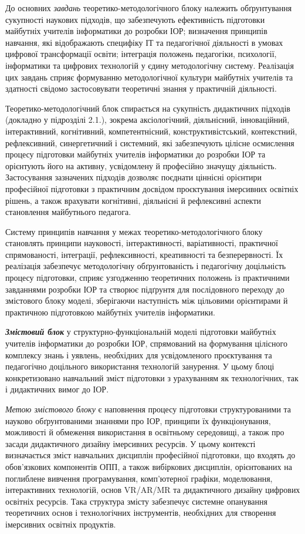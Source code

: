 До основних \emph{завдань} теоретико-методологічного блоку належить обґрунтування сукупності наукових підходів, що забезпечують ефективність підготовки майбутніх учителів інформатики до розробки ІОР; визначення принципів навчання, які відображають специфіку ІТ та педагогічної діяльності в умовах цифрової трансформації освіти; інтеграція положень педагогіки, психології, інформатики та цифрових технологій у єдину методологічну систему. Реалізація цих завдань сприяє формуванню методологічної культури майбутніх учителів та здатності свідомо застосовувати теоретичні знання у практичній діяльності.

Теоретико-методологічний блок спирається на сукупність дидактичних підходів (докладно у підрозділі 2.1.), зокрема аксіологічний, діяльнісний, інноваційний, інтерактивний, когнітивний, компетентнісний, конструктивістський, контекстний, рефлексивний, синергетичний і системний, які забезпечують цілісне осмислення процесу підготовки майбутніх учителів інформатики до розробки ІОР та орієнтують його на активну, усвідомлену й професійно значущу діяльність. Застосування зазначених підходів дозволяє поєднати ціннісні орієнтири професійної підготовки з практичним досвідом проєктування імерсивних освітніх рішень, а також врахувати когнітивні, діяльнісні й рефлексивні аспекти становлення майбутнього педагога.

Систему принципів навчання у межах теоретико-методологічного блоку становлять принципи науковості, інтерактивності, варіативності, практичної спрямованості, інтеграції, рефлексивності, креативності та безперервності. Їх реалізація забезпечує методологічну обґрунтованість і педагогічну доцільність процесу підготовки, сприяє узгодженню теоретичних положень із практичними завданнями розробки ІОР та створює підґрунтя для послідовного переходу до змістового блоку моделі, зберігаючи наступність між цільовими орієнтирами й практичною підготовкою майбутніх учителів інформатики.

\emph{\textbf{Змістовий блок}} у структурно-функціональній моделі підготовки майбутніх учителів інформатики до розробки ІОР, спрямований на формування цілісного комплексу знань і уявлень, необхідних для усвідомленого проєктування та педагогічно доцільного використання технологій занурення. У цьому блоці конкретизовано навчальний зміст підготовки з урахуванням як технологічних, так і дидактичних вимог до ІОР.

\emph{Метою змістового блоку} є наповнення процесу підготовки структурованими та науково обґрунтованими знаннями про ІОР, принципи їх функціонування, можливості й обмеження використання в освітньому середовищі, а також про засади дидактичного дизайну імерсивних ресурсів. У цьому контексті визначається зміст навчальних дисциплін професійної підготовки, що входять до обов'язкових компонентів ОПП, а також вибіркових дисциплін, орієнтованих на поглиблене вивчення програмування, комп'ютерної графіки, моделювання, інтерактивних технологій, основ VR/AR/MR та дидактичного дизайну цифрових освітніх ресурсів. Така структура змісту забезпечує системне опанування теоретичних основ і технологічних інструментів, необхідних для створення імерсивних освітніх продуктів.

